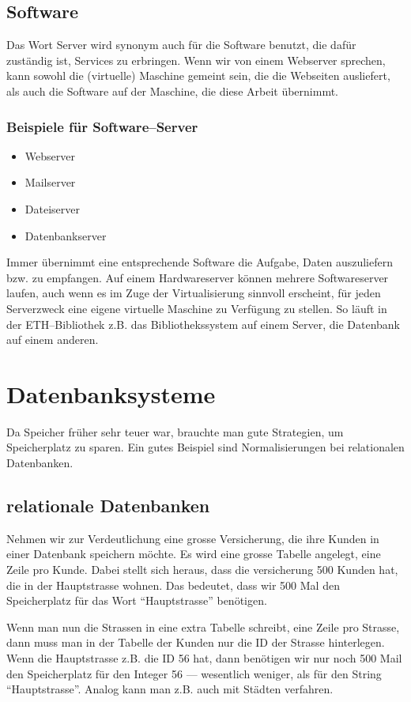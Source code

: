     \subsection{Software}

      Das Wort Server wird synonym auch für die Software benutzt, die dafür zuständig ist, Services zu erbringen. Wenn wir von einem Webserver sprechen, kann sowohl die (virtuelle) Maschine gemeint sein, die die Webseiten ausliefert, als auch die Software auf der Maschine, die diese Arbeit übernimmt.

      \begin{frame}
      \frametitle{Beispiele für Software--Server}
        \begin{itemize}
          \item Webserver
          \item Mailserver
          \item Dateiserver
          \item Datenbankserver
        \end{itemize}
      \end{frame}

      Immer übernimmt eine entsprechende Software die Aufgabe, Daten auszuliefern bzw. zu empfangen. Auf einem Hardwareserver können mehrere Softwareserver laufen, auch wenn es im Zuge der Virtualisierung sinnvoll erscheint, für jeden Serverzweck eine eigene virtuelle Maschine zu Verfügung zu stellen. So läuft in der ETH--Bibliothek z.B. das Bibliothekssystem auf einem Server, die Datenbank auf einem anderen.


\section{Datenbanksysteme}
  Da Speicher früher sehr teuer war, brauchte man gute Strategien, um Speicherplatz zu sparen. Ein gutes Beispiel sind Normalisierungen bei relationalen Datenbanken.  
  \subsection{relationale Datenbanken}
    Nehmen wir zur Verdeutlichung eine grosse Versicherung, die ihre Kunden in einer Datenbank speichern möchte. Es wird eine grosse Tabelle angelegt, eine Zeile pro Kunde. Dabei stellt sich heraus, dass die versicherung 500 Kunden hat, die in der Hauptstrasse wohnen. Das bedeutet, dass wir 500 Mal den Speicherplatz für das Wort ``Hauptstrasse'' benötigen. 

    Wenn man nun die Strassen in eine extra Tabelle schreibt, eine Zeile pro Strasse, dann muss man in der Tabelle der Kunden nur die ID der Strasse hinterlegen. Wenn die Hauptstrasse z.B. die ID 56 hat, dann benötigen wir nur noch 500 Mail den Speicherplatz für den Integer 56 --- wesentlich weniger, als für den String ``Hauptstrasse''. Analog kann man z.B. auch mit Städten verfahren. 

